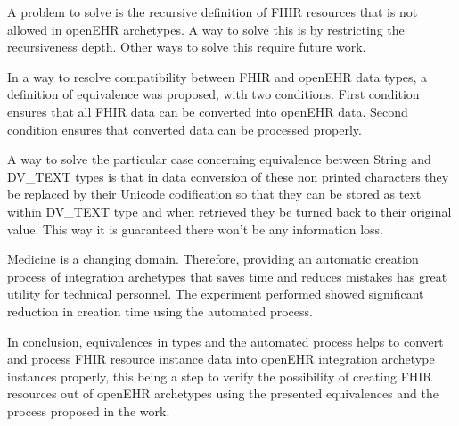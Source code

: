 A problem to solve is the recursive definition of FHIR resources that is not allowed in openEHR archetypes. A way to solve this is by restricting the recursiveness depth. Other ways to solve this require future work.

In a way to resolve compatibility between FHIR and openEHR data types, a definition of equivalence was proposed, with two conditions. First condition ensures that all FHIR data can be converted into openEHR data. Second condition ensures that converted data can be processed properly.

A way to solve the particular case concerning equivalence between String and DV\_TEXT types is that in data conversion of these non printed characters they be replaced by their Unicode codification so that they can be stored as text within DV\_TEXT type and when retrieved they be turned back to their original value. This way it is guaranteed there won’t be any information loss.

Medicine is a changing domain. Therefore, providing an automatic creation process of integration archetypes that saves time and reduces mistakes has great utility for technical personnel. The experiment performed showed significant reduction in creation time using the automated process.

In conclusion, equivalences in types and the automated process helps to convert and process FHIR resource instance data into openEHR integration archetype instances properly, this being a step to verify the possibility of creating FHIR resources out of openEHR archetypes using the presented equivalences and the process proposed in the work.
